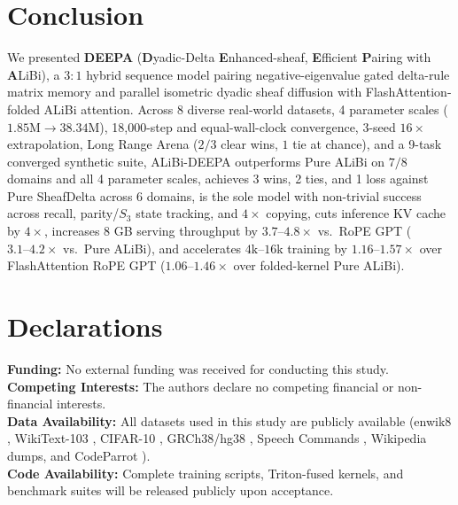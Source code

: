 \documentclass[10pt,a4paper]{article}
\begin{document}
\section{Conclusion}

We presented \textbf{DEEPA} (\textbf{D}yadic-Delta \textbf{E}nhanced-sheaf, \textbf{E}fficient \textbf{P}airing with \textbf{A}LiBi), a $3:1$ hybrid sequence model pairing negative-eigenvalue gated delta-rule matrix memory and parallel isometric dyadic sheaf diffusion with FlashAttention-folded ALiBi attention. Across 8 diverse real-world datasets, 4 parameter scales ($1.85\text{M}\to 38.34\text{M}$), 18,000-step and equal-wall-clock convergence, 3-seed $16\times$ extrapolation, Long Range Arena ($2/3$ clear wins, $1$ tie at chance), and a 9-task converged synthetic suite, ALiBi-DEEPA outperforms Pure ALiBi on $7/8$ domains and all 4 parameter scales, achieves 3 wins, 2 ties, and 1 loss against Pure SheafDelta across 6 domains, is the sole model with non-trivial success across recall, parity/$S_3$ state tracking, and $4\times$ copying, cuts inference KV cache by $4\times$, increases 8 GB serving throughput by $3.7\text{--}4.8\times$ vs.\ RoPE GPT ($3.1\text{--}4.2\times$ vs.\ Pure ALiBi), and accelerates $4\text{k}\text{--}16\text{k}$ training by $1.16\text{--}1.57\times$ over FlashAttention RoPE GPT ($1.06\text{--}1.46\times$ over folded-kernel Pure ALiBi).

\section*{Declarations}
\small
\noindent\textbf{Funding:} No external funding was received for conducting this study.\\
\noindent\textbf{Competing Interests:} The authors declare no competing financial or non-financial interests.\\
\noindent\textbf{Data Availability:} All datasets used in this study are publicly available (enwik8 \cite{hutter2006}, WikiText-103 \cite{merity2016}, CIFAR-10 \cite{krizhevsky2009}, GRCh38/hg38 \cite{grch38}, Speech Commands \cite{warden2018}, Wikipedia dumps, and CodeParrot \cite{codeparrot}).\\
\noindent\textbf{Code Availability:} Complete training scripts, Triton-fused kernels, and benchmark suites will be released publicly upon acceptance.
\end{document}
